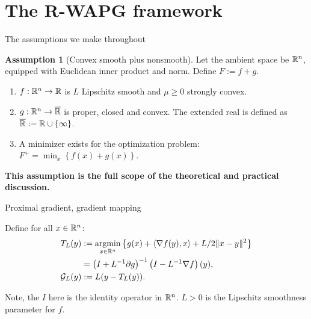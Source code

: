 \documentclass[11pt]{beamer}
\theoremstyle{definition}
\newtheorem{assumption}{Assumption}[section]
\begin{document}
\section{The R-WAPG framework}
    \begin{frame}{The assumptions we make throughout}
        \begin{assumption}[Convex smooth plus nonsmooth]
            Let the ambient space be $\mathbb R^n$, equipped with Euclidean inner product and norm. 
            Define $F := f + g$.
            \begin{enumerate}
                \item $f: \mathbb R^n \rightarrow \mathbb R$ is $L$ Lipschitz smooth and $\mu \ge 0$ strongly convex.
                \item $g: \mathbb R^n \rightarrow \overline {\mathbb R}$ is proper, closed and convex. The extended real is defined as $\overline {\mathbb R} := \mathbb R \cup \{\infty\}$.
                \item A minimizer exists for the optimization problem: $F^+ = \min_x \left\lbrace f(x) + g(x)\right\rbrace$.
            \end{enumerate}
        \end{assumption}
        \textbf{This assumption is the full scope of the theoretical and practical discussion. }
    \end{frame}
    \begin{frame}{Proximal gradient, gradient mapping}
        \begin{definition}
            Define for all $x\in \mathbb R^n$: 
            \begin{align*}
                T_L(y) 
                &:= \mathop{\rm argmin}\limits_{x \in \mathbb R^n} \left\lbrace
                    g(x) + \langle \nabla f(y), x\rangle + L/2\Vert x - y\Vert^2
                \right\rbrace 
                \\
                &= \left(I + L^{-1}\partial g\right)^{-1}
                \left(I - L^{-1}\nabla f\right)(y),
                \\
                \mathcal G_L(y)
                &:= L(y - T_L(y)).
            \end{align*}
        \end{definition}
        Note, the $I$ here is the identity operator in $\mathbb R^n$. 
        $L > 0$ is the Lipschitz smoothness parameter for $f$. 
    \end{frame}
\end{document}
